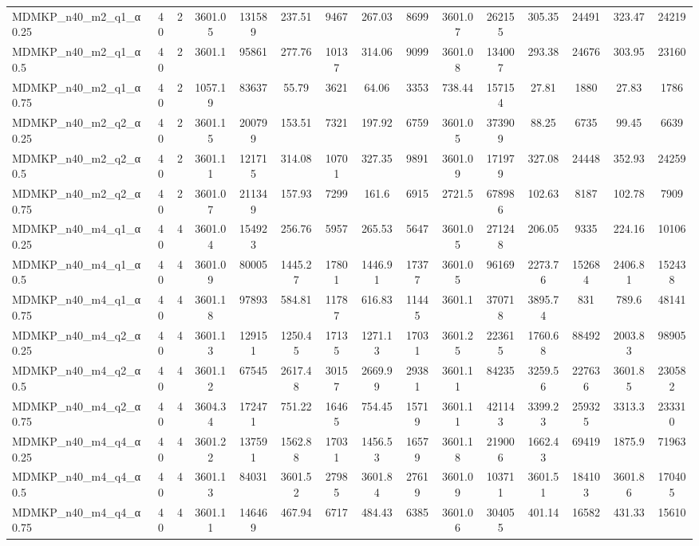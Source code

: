\begin{table}[!ht]
{\begin{tabular}{lcccccccccccccc}
MDMKP\_n40\_m2\_q1\_α0.25 & 40 & 2 & 3601.05 & 131589 & 237.51 & 9467 & 267.03 & 8699 & 3601.07 & 262155 & 305.35 & 24491 & 323.47 & 24219 \\
MDMKP\_n40\_m2\_q1\_α0.5 & 40 & 2 & 3601.1 & 95861 & 277.76 & 10137 & 314.06 & 9099 & 3601.08 & 134007 & 293.38 & 24676 & 303.95 & 23160 \\
MDMKP\_n40\_m2\_q1\_α0.75 & 40 & 2 & 1057.19 & 83637 & 55.79 & 3621 & 64.06 & 3353 & 738.44 & 157154 & 27.81 & 1880 & 27.83 & 1786 \\
MDMKP\_n40\_m2\_q2\_α0.25 & 40 & 2 & 3601.15 & 200799 & 153.51 & 7321 & 197.92 & 6759 & 3601.05 & 373909 & 88.25 & 6735 & 99.45 & 6639 \\
MDMKP\_n40\_m2\_q2\_α0.5 & 40 & 2 & 3601.11 & 121715 & 314.08 & 10701 & 327.35 & 9891 & 3601.09 & 171979 & 327.08 & 24448 & 352.93 & 24259 \\
MDMKP\_n40\_m2\_q2\_α0.75 & 40 & 2 & 3601.07 & 211349 & 157.93 & 7299 & 161.6 & 6915 & 2721.5 & 678986 & 102.63 & 8187 & 102.78 & 7909 \\
MDMKP\_n40\_m4\_q1\_α0.25 & 40 & 4 & 3601.04 & 154923 & 256.76 & 5957 & 265.53 & 5647 & 3601.05 & 271248 & 206.05 & 9335 & 224.16 & 10106 \\
MDMKP\_n40\_m4\_q1\_α0.5 & 40 & 4 & 3601.09 & 80005 & 1445.27 & 17801 & 1446.91 & 17377 & 3601.05 & 96169 & 2273.76 & 152684 & 2406.81 & 152438 \\
MDMKP\_n40\_m4\_q1\_α0.75 & 40 & 4 & 3601.18 & 97893 & 584.81 & 11787 & 616.83 & 11445 & 3601.1 & 370718 & 3895.74 & 831 & 789.6 & 48141 \\
MDMKP\_n40\_m4\_q2\_α0.25 & 40 & 4 & 3601.13 & 129151 & 1250.45 & 17135 & 1271.13 & 17031 & 3601.25 & 223615 & 1760.68 & 88492 & 2003.83 & 98905 \\
MDMKP\_n40\_m4\_q2\_α0.5 & 40 & 4 & 3601.12 & 67545 & 2617.48 & 30157 & 2669.99 & 29381 & 3601.11 & 84235 & 3259.56 & 227636 & 3601.85 & 230582 \\
MDMKP\_n40\_m4\_q2\_α0.75 & 40 & 4 & 3604.34 & 172471 & 751.22 & 16465 & 754.45 & 15719 & 3601.11 & 421143 & 3399.23 & 259325 & 3313.3 & 233310 \\
MDMKP\_n40\_m4\_q4\_α0.25 & 40 & 4 & 3601.22 & 137591 & 1562.88 & 17031 & 1456.53 & 16579 & 3601.18 & 219006 & 1662.43 & 69419 & 1875.9 & 71963 \\
MDMKP\_n40\_m4\_q4\_α0.5 & 40 & 4 & 3601.13 & 84031 & 3601.52 & 27985 & 3601.84 & 27619 & 3601.09 & 103711 & 3601.51 & 184103 & 3601.86 & 170405 \\
MDMKP\_n40\_m4\_q4\_α0.75 & 40 & 4 & 3601.11 & 146469 & 467.94 & 6717 & 484.43 & 6385 & 3601.06 & 304055 & 401.14 & 16582 & 431.33 & 15610 \\

\end{tabular}}
\end{table}
